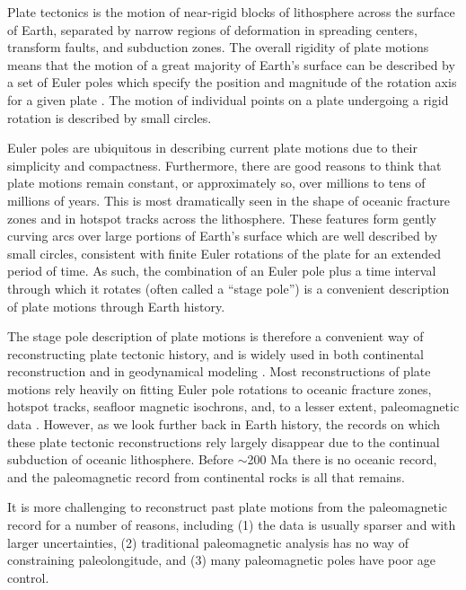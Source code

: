 \documentclass[preprint,12pt,authoryear]{elsarticle}
\begin{document}
Plate tectonics is the motion of near-rigid blocks of lithosphere across the surface of Earth, 
separated by narrow regions of deformation in spreading centers, transform faults, and subduction zones.
The overall rigidity of plate motions means that the motion of a great majority of Earth's surface
can be described by a set of Euler poles which specify the position and magnitude of the rotation axis for a
given plate \citep[cf.][]{cox2009plate}. The motion of individual points on a plate undergoing
a rigid rotation is described by small circles.

Euler poles are ubiquitous in describing current plate motions 
\citep[e.g.][]{demets1990current, argus2011geologically} due to their simplicity and compactness.
Furthermore, there are good reasons to think that plate motions remain constant, or approximately
so, over millions to tens of millions of years. This is most dramatically seen in the shape
of oceanic fracture zones and in hotspot tracks across the lithosphere. These features
form gently curving arcs over large portions of Earth's surface which are well described by small
circles, consistent with finite Euler rotations of the plate for an extended period of time.
As such, the combination of an Euler pole plus a time interval through which it rotates 
(often called a ``stage pole'') is a convenient description of plate motions through Earth history.

The stage pole description of plate motions is therefore a convenient way of reconstructing
plate tectonic history, and is widely used in both continental reconstruction 
\citep[e.g.][]{boyden2011next} and in geodynamical
modeling \citep[e.g.][]{mcnamara2005thermochemical, bull2014effect, rudolph2014history}.
Most reconstructions of plate motions rely heavily on fitting Euler pole rotations
to oceanic fracture zones, hotspot tracks, seafloor magnetic isochrons,
and, to a lesser extent, paleomagnetic data \citep{muller1993revised, seton2012global}.
However, as we look further back in Earth history, the records on which these
plate tectonic reconstructions rely largely disappear due to the continual
subduction of oceanic lithosphere. Before $\sim$200 Ma there is no oceanic record,
and the paleomagnetic record from continental rocks is all that remains.

It is more challenging to reconstruct past plate motions from the paleomagnetic
record for a number of reasons, including 
(1) the data is usually sparser and with larger uncertainties,
(2) traditional paleomagnetic analysis has no way of constraining paleolongitude, and
(3) many paleomagnetic poles have poor age control.
\end{document}
